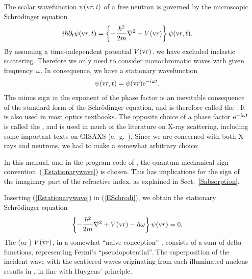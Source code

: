 %
The scalar wavefunction $\psi(\text{v}{r},t)$
%
%
%
of a free neutron
is governed by the microscopic Schrödinger equation
\begin{equation}\label{ESchrodi}
  i\hbar\partial_t \psi(\text{v}{r},t)
  = \left\{-\frac{\hbar^2}{2m}\mathbf{\nabla}^2+V(\text{v}{r})\right\} \psi(\text{v}{r},t).
\end{equation}
By assuming a time-independent potential $V(\text{v}{r})$,
we have excluded inelastic scattering.
Therefore we only need to consider monochromatic waves
with given frequency~$\omega$.
%
In consequence, we have a stationary wavefunction
\begin{equation}\label{Estationarywave}
  \psi(\text{v}{r},t) = \psi(\text{v}{r})\text{e}^{-i\omega t}.
\end{equation}
%
The minus sign in the exponent of the phase factor
is an inevitable consequence of the standard form of the Schrödinger equation,
and is therefore called the .
It is also used in most optics textbooks.
%
%
%
The opposite choice of a phase factor $\text{e}^{+i\omega t}$ is 
called the ,
and is used in much of the literature on X-ray scattering,
including some important texts on GISAXS (e.~g.\ \cite{ReLL09}).
Since we are concerned with both X-rays and neutrons,
we had to make a somewhat arbitrary choice:

\Note
{\indent In this manual, and in the program code of \BornAgain,
the quantum-mechanical sign convention~(\ref{Estationarywave}) is chosen.
This has implications for the sign of the imaginary part of the
refractive index,
%
as explained in Sect.~\ref{Sabsorption}.}

Inserting (\ref{Estationarywave}) in (\ref{ESchrodi}),
we obtain the stationary Schrödinger equation
\begin{equation}\label{EstatSchrodi}
  \left\{-\frac{\hbar^2}{2m}\mathbf{\nabla}^2+V(\text{v}{r})-\hbar\omega\right\} \psi(\text{v}{r}) = 0.
\end{equation}
%
%
%
%
The  (or )
 $V(\text{v}{r})$,
in a somewhat ``naive conception'' \cite[p.~7]{Sea89},
consists of a sum of delta functions,
representing Fermi's ``pseudopotential''.
%
The superposition of the incident wave with the scattered waves
originating from each illuminated nucleus
results in ,
%
in line with Huygens' principle.
%

